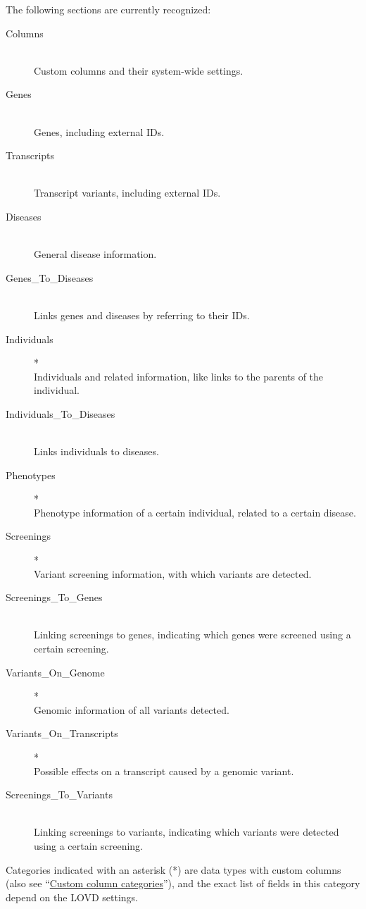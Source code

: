 \documentclass[a4paper,oneside,openany,12pt]{memoir}
\begin{document}
\noindent
The following sections are currently recognized:
\begin{description}
  \item[Columns] \hfill \\
    Custom columns and their system-wide settings.
  \item[Genes] \hfill \\
    Genes, including external IDs.
  \item[Transcripts] \hfill \\
    Transcript variants, including external IDs.
  \item[Diseases] \hfill \\
    General disease information.
  \item[Genes\_To\_Diseases] \hfill \\
    Links genes and diseases by referring to their IDs.
  \item[Individuals]* \hfill \\
    Individuals and related information, like links to the parents of the individual.
  \item[Individuals\_To\_Diseases] \hfill \\
    Links individuals to diseases.
  \item[Phenotypes]* \hfill \\
    Phenotype information of a certain individual, related to a certain disease.
  \item[Screenings]* \hfill \\
    Variant screening information, with which variants are detected.
  \item[Screenings\_To\_Genes] \hfill \\
    Linking screenings to genes, indicating which genes were screened using a certain screening.
  \item[Variants\_On\_Genome]* \hfill \\
    Genomic information of all variants detected.
  \item[Variants\_On\_Transcripts]* \hfill \\
    Possible effects on a transcript caused by a genomic variant.
  \item[Screenings\_To\_Variants] \hfill \\
    Linking screenings to variants, indicating which variants were detected using a certain screening.
\end{description}
\noindent
Categories indicated with an asterisk (*) are data types with custom columns (also see ``\hyperlink{sec:custom_column_categories}{Custom column categories}''),
 and the exact list of fields in this category depend on the LOVD settings.
\end{document}

